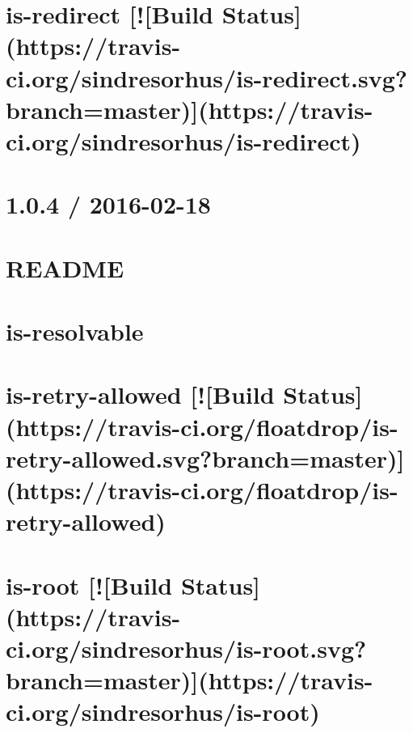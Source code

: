 \documentclass[twoside]{book}
\newcommand{\+}{\discretionary{\mbox{\scriptsize$\hookleftarrow$}}{}{}}
\begin{document}
\chapter{is-\/redirect \mbox{[}!\mbox{[}Build Status\mbox{]}(https\+://travis-\/ci.org/sindresorhus/is-\/redirect.svg?branch=master)\mbox{]}(https\+://travis-\/ci.org/sindresorhus/is-\/redirect)}
\label{md__c_1_workspace_demo_src_main_script_node_modules_is-redirect_readme}

\chapter{1.0.4 / 2016-\/02-\/18}
\label{md__c_1_workspace_demo_src_main_script_node_modules_is-regex__c_h_a_n_g_e_l_o_g}

\chapter{R\+E\+A\+D\+ME}
\label{md__c_1_workspace_demo_src_main_script_node_modules_is-regex__r_e_a_d_m_e}

\chapter{is-\/resolvable}
\label{md__c_1_workspace_demo_src_main_script_node_modules_is-resolvable__r_e_a_d_m_e}

\chapter{is-\/retry-\/allowed \mbox{[}!\mbox{[}Build Status\mbox{]}(https\+://travis-\/ci.org/floatdrop/is-\/retry-\/allowed.svg?branch=master)\mbox{]}(https\+://travis-\/ci.org/floatdrop/is-\/retry-\/allowed)}
\label{md__c_1_workspace_demo_src_main_script_node_modules_is-retry-allowed_readme}

\chapter{is-\/root \mbox{[}!\mbox{[}Build Status\mbox{]}(https\+://travis-\/ci.org/sindresorhus/is-\/root.svg?branch=master)\mbox{]}(https\+://travis-\/ci.org/sindresorhus/is-\/root)}
\label{md__c_1_workspace_demo_src_main_script_node_modules_is-root_readme}

\end{document}
